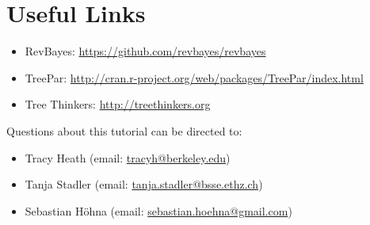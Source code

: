 
\bigskip
\section*{Useful Links}

\begin{itemize}
\item RevBayes: \href{https://github.com/revbayes/revbayes}{https://github.com/revbayes/revbayes} \\ \vspace{-7mm}
\item TreePar: \href{http://cran.r-project.org/web/packages/TreePar/index.html}{http://cran.r-project.org/web/packages/TreePar/index.html} \\ \vspace{-7mm}
\item Tree Thinkers: \href{http://treethinkers.org/}{http://treethinkers.org} \\ \vspace{-7mm}
\end{itemize}

Questions about this tutorial can be directed to: \\\vspace{-10mm}
\begin{itemize}
\item Tracy Heath (email: \href{mailto:tracyh@berkeley.edu}{tracyh@berkeley.edu}) \\\vspace{-8mm}
\item Tanja Stadler (email: \href{mailto:tanja.stadler@bsse.ethz.ch}{tanja.stadler@bsse.ethz.ch}) \\\vspace{-8mm} 
\item Sebastian H\"{o}hna (email: \href{mailto:sebastian.hoehna@gmail.com}{sebastian.hoehna@gmail.com})
\end{itemize}
